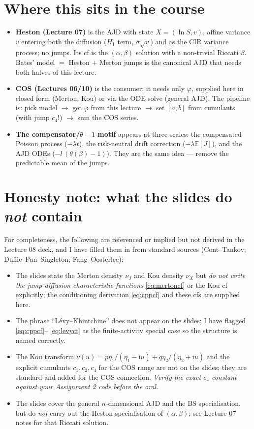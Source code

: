 \documentclass[11pt]{article}
\newcommand{\E}{\mathbb{E}}
\newcommand{\ii}{\mathrm{i}}
\newcommand{\ch}{\varphi}
\begin{document}
\section{Where this sits in the course}
\begin{itemize}[topsep=2pt,itemsep=2pt]
  \item \textbf{Heston (Lecture 07)} is the AJD with state $X=(\ln S,v)$, affine variance $v$ entering
  both the diffusion ($H_1$ term, $\sigma\sqrt v$) and as the CIR variance process; no jumps. Its cf is
  the $(\alpha,\beta)$ solution with a non-trivial Riccati $\beta$. Bates' model $=$ Heston $+$ Merton
  jumps is the canonical AJD that needs both halves of this lecture.
  \item \textbf{COS (Lectures 06/10)} is the consumer: it needs only $\ch$, supplied here in closed form
  (Merton, Kou) or via the ODE solve (general AJD). The pipeline is: pick model $\to$ get $\ch$ from this
  lecture $\to$ set $[a,b]$ from cumulants (with jump $c_4$!) $\to$ sum the COS series.
  \item \textbf{The compensator/$\theta-1$ motif} appears at three scales: the compensated Poisson process
  ($-\lambda t$), the risk-neutral drift correction ($-\lambda\E[J]$), and the AJD ODEs
  ($-l\,(\theta(\beta)-1)$). They are the same idea --- remove the predictable mean of the jumps.
\end{itemize}

\section*{Honesty note: what the slides do \emph{not} contain}
For completeness, the following are referenced or implied but not derived in the Lecture 08 deck, and I
have filled them in from standard sources (Cont--Tankov; Duffie--Pan--Singleton; Fang--Oosterlee):
\begin{itemize}[topsep=2pt,itemsep=1pt]
  \item The slides state the Merton density $\nu_J$ and Kou density $\nu_X$ but \emph{do not write the
  jump-diffusion characteristic functions} \eqref{eq:mertoncf} or the Kou cf explicitly; the
  conditioning derivation \eqref{eq:cppcf} and these cfs are supplied here.
  \item The phrase ``L\'evy--Khintchine'' does not appear on the slides; I have flagged \eqref{eq:cppcf}--%
  \eqref{eq:levycf} as the finite-activity special case so the structure is named correctly.
  \item The Kou transform $\widehat\nu(u)=p\eta_1/(\eta_1-\ii u)+q\eta_2/(\eta_2+\ii u)$ and the explicit
  cumulants $c_1,c_2,c_4$ for the COS range are not on the slides; they are standard and added for the
  COS connection. \emph{Verify the exact $c_4$ constant against your Assignment 2 code before the oral.}
  \item The slides cover the general $n$-dimensional AJD and the BS specialisation, but do \emph{not}
  carry out the Heston specialisation of $(\alpha,\beta)$; see Lecture 07 notes for that Riccati solution.
\end{itemize}
\end{document}
